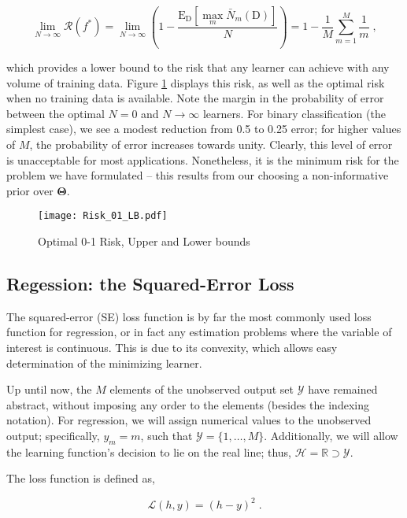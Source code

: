 \documentclass[12pt]{article}
\begin{document}
\begin{equation}
\lim_{N \to \infty} \mathcal{R}(f^*)  = \lim_{N \to \infty} \left( 1 - \frac{\text{E}_\mathrm{D} \left[ \max_m \bar{N}_m(\mathrm{D}) \right]}{N} \right) = 1 - \frac{1}{M} \sum_{m=1}^M \frac{1}{m} \;,
\end{equation}

which provides a lower bound to the risk that any learner can achieve with any volume of training data. Figure \ref{fig:Risk_01_LB} displays this risk, as well as the optimal risk when no training data is available. Note the margin in the probability of error between the optimal $N=0$ and $N \to \infty$ learners. For binary classification (the simplest case), we see a modest reduction from 0.5 to 0.25 error; for higher values of $M$, the probability of error increases towards unity. Clearly, this level of error is unacceptable for most applications. Nonetheless, it is the minimum risk for the problem we have formulated -- this results from our choosing a non-informative prior over $\bm{\Theta}$.


\begin{figure}
\centering
\texttt{[image: Risk\_01\_LB.pdf]}
\caption{Optimal 0-1 Risk, Upper and Lower bounds}
\label{fig:Risk_01_LB}
\end{figure}




\subsection{Regession: the Squared-Error Loss}

The squared-error (SE) loss function is by far the most commonly used loss function for regression, or in fact any estimation problems where the variable of interest is continuous. This is due to its convexity, which allows easy determination of the minimizing learner. 

Up until now, the $M$ elements of the unobserved output set $\mathcal{Y}$ have remained abstract, without imposing any order to the elements (besides the indexing notation). For regression, we will assign numerical values to the unobserved output; specifically, $y_m = m$, such that $\mathcal{Y} = \{1,\ldots,M\}$. Additionally, we will allow the learning function's decision to lie on the real line; thus, $\mathcal{H} = \mathbb{R} \supset \mathcal{Y}$.

The loss function is defined as,

\begin{equation}
\mathcal{L}(h,y) = (h-y)^2 \;.
\end{equation}
\end{document}
